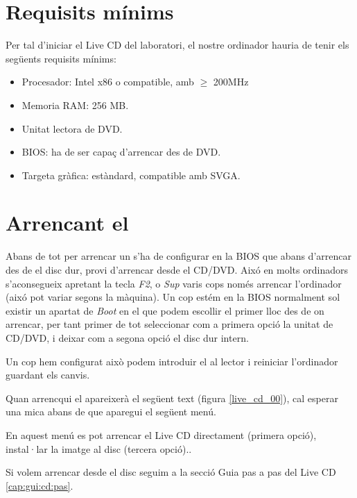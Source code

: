 \section{Requisits mínims}
Per tal d'iniciar el Live CD del laboratori, el nostre ordinador hauria de tenir els següents requisits mínims:
\begin{itemize}
	\item Procesador: Intel x86 o compatible, amb $\geq$ 200MHz
	\item Memoria RAM: 256 MB.
	\item Unitat lectora de DVD.
	\item BIOS: ha de ser capaç d'arrencar des de DVD.
	\item Targeta gràfica: estàndard, compatible amb SVGA.
\end{itemize}



\section{Arrencant el \LiveCD}\label{cap:gui:cd:boot}

Abans de tot per arrencar un \LiveCD s'ha de configurar en la BIOS que abans d'arrencar des de el disc dur, provi d'arrencar desde el CD/DVD. Aixó en molts ordinadors s'aconsegueix apretant la tecla \emph{F2}, o \emph{Sup} varis cops només arrencar l'ordinador (aixó pot variar segons la màquina). Un cop estém en la BIOS normalment sol existir un apartat de \emph{Boot} en el que podem escollir el primer lloc des de on arrencar, per tant primer de tot seleccionar com a primera opció la unitat de CD/DVD, i deixar com a segona opció el disc dur intern.

Un cop hem configurat això podem introduir el \LiveCD al lector i reiniciar l'ordinador guardant els canvis.

Quan arrencqui el \LiveCD apareixerà el següent text (figura \ref{live_cd_00}), cal esperar una mica abans de que aparegui el següent menú.

En aquest menú es pot arrencar el Live CD directament (primera opció), instal·lar la imatge al disc (tercera opció)..

Si volem arrencar desde el disc seguim a la secció Guia pas a pas del Live CD \ref{cap:gui:cd:pas}.

